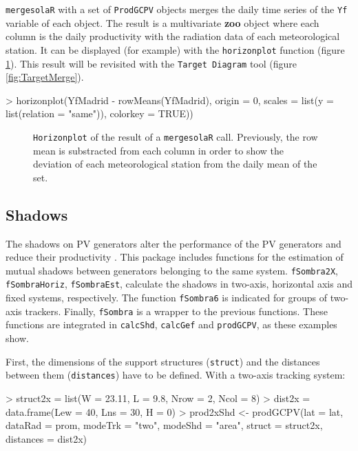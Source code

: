 \documentclass[a4paper]{article}
\renewenvironment{Schunk}{\vspace{\topsep}}{\vspace{\topsep}}
\newcommand{\code}[1]{{\texttt{#1}}}
\newcommand{\pkg}[1]{{\textbf{#1}}}
\begin{document}
\code{mergesolaR} with a set of \code{ProdGCPV} objects merges
the daily time series of the \code{Yf} variable of each object. The
result is a multivariate \pkg{zoo} object where each column is the
daily productivity with the radiation data of each meteorological
station. It can be displayed (for example) with the
\code{horizonplot} function (figure \ref{fig:horizonMerge}). This
result will be revisited with the \code{Target Diagram} tool (figure
\ref{fig:TargetMerge}). 

\begin{Schunk}
\begin{Sinput}
> horizonplot(YfMadrid - rowMeans(YfMadrid), origin = 0, 
     scales = list(y = list(relation = "same")), colorkey = TRUE))
\end{Sinput}
\end{Schunk}


\begin{figure}
  \centering
\caption{\code{Horizonplot} of the result of a \code{mergesolaR}
    call. Previously, the row mean is substracted from each column in
    order to show the deviation of each meteorological station from
    the daily mean of the set.}
  \label{fig:horizonMerge}
\end{figure}





\subsection{Shadows}
\label{sec:shadows}

The shadows on PV generators alter the performance of the PV
generators and reduce their productivity \cite{Perpinan2008}.  This
package includes functions for the estimation of mutual shadows
between generators belonging to the same system. \code{fSombra2X},
\code{fSombraHoriz}, \code{fSombraEst}, calculate the shadows in
two-axis, horizontal axis and fixed systems, respectively.  The
function \code{fSombra6} is indicated for groups of two-axis
trackers.  Finally, \code{fSombra} is a wrapper to the previous
functions. These functions are integrated in \code{calcShd},
\code{calcGef} and \code{prodGCPV}, as these examples show.

First, the dimensions of the support structures (\code{struct}) and
the distances between them (\code{distances}) have to be defined. 
With a two-axis tracking system:
\begin{Schunk}
\begin{Sinput}
> struct2x = list(W = 23.11, L = 9.8, Nrow = 2, Ncol = 8)
> dist2x = data.frame(Lew = 40, Lns = 30, H = 0)
> prod2xShd <- prodGCPV(lat = lat, dataRad = prom, modeTrk = "two", 
     modeShd = "area", struct = struct2x, distances = dist2x)
\end{Sinput}
\end{Schunk}
\end{document}
